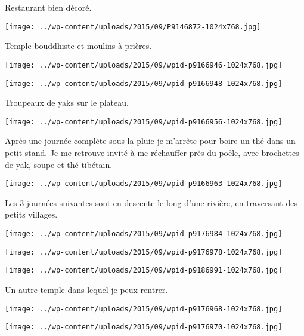 \pagebreak
 Restaurant bien décoré.
\begin{center} \texttt{[image: ../wp-content/uploads/2015/09/P9146872-1024x768.jpg]} \end{center}

  Temple bouddhiste et moulins à prières.
\begin{center} \texttt{[image: ../wp-content/uploads/2015/09/wpid-p9166946-1024x768.jpg]} \end{center}
\begin{center} \texttt{[image: ../wp-content/uploads/2015/09/wpid-p9166948-1024x768.jpg]} \end{center}

 Troupeaux de yaks sur le plateau.
\begin{center} \texttt{[image: ../wp-content/uploads/2015/09/wpid-p9166956-1024x768.jpg]} \end{center}

\pagebreak
 Après une journée complète sous la pluie je m'arrête pour boire un thé dans un petit stand. Je me retrouve invité à me réchauffer près du poêle, avec brochettes de yak, soupe et thé tibétain.
\begin{center} \texttt{[image: ../wp-content/uploads/2015/09/wpid-p9166963-1024x768.jpg]} \end{center}

 Les 3 journées suivantes sont en descente le long d'une rivière, en traversant des petits villages.
\begin{center} \texttt{[image: ../wp-content/uploads/2015/09/wpid-p9176984-1024x768.jpg]} \end{center}
\begin{center} \texttt{[image: ../wp-content/uploads/2015/09/wpid-p9176978-1024x768.jpg]} \end{center}
\begin{center} \texttt{[image: ../wp-content/uploads/2015/09/wpid-p9186991-1024x768.jpg]} \end{center}

\pagebreak
 Un autre temple dans lequel je peux rentrer.
\begin{center} \texttt{[image: ../wp-content/uploads/2015/09/wpid-p9176968-1024x768.jpg]} \end{center}
\begin{center} \texttt{[image: ../wp-content/uploads/2015/09/wpid-p9176970-1024x768.jpg]} \end{center}

